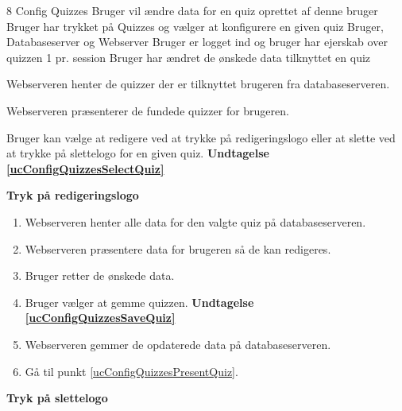 \uchead
	{8} %
	{Config Quizzes} %
	{Bruger vil ændre data for en quiz oprettet af denne bruger} %
	{Bruger har trykket på Quizzes og vælger at konfigurere en given quiz} %
	{Bruger, Databaseserver og Webserver} %
	{Bruger er logget ind og bruger har ejerskab over quizzen} %
	{} %
	{1 pr. session} %
	{Bruger har ændret de ønskede data tilknyttet en quiz} %


\item\label{ucConfigQuizzesPresentQuiz} Webserveren henter de quizzer der er tilknyttet brugeren fra databaseserveren.

\item Webserveren præsenterer de fundede quizzer for brugeren.

\item\label{ucConfigQuizzesSelectQuiz} Bruger kan vælge at redigere ved at trykke på redigeringslogo eller at slette ved at trykke på slettelogo for en given quiz. \textbf{Undtagelse \ref{ucConfigQuizzesSelectQuiz}}

\textbf{Tryk på redigeringslogo}

	\begin{enumerate}
		\item Webserveren henter alle data for den valgte quiz på databaseserveren.
		
		\item Webserveren præsentere data for brugeren så de kan redigeres.
		
		\item Bruger retter de ønskede data.
		
		\item\label{ucConfigQuizzesSaveQuiz} Bruger vælger at gemme quizzen. \textbf{Undtagelse \ref{ucConfigQuizzesSaveQuiz}}
		
		\item Webserveren gemmer de opdaterede data på databaseserveren.
		
		\item Gå til punkt \ref{ucConfigQuizzesPresentQuiz}.
		
	\end{enumerate}

\textbf{Tryk på slettelogo}
	
